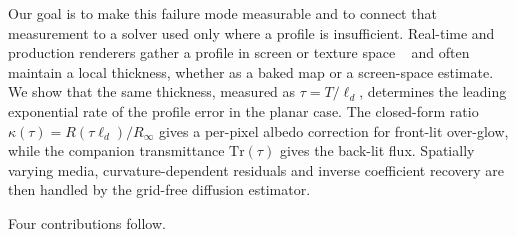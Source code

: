\documentclass[11pt]{article}
\newcommand{\ld}{\ell_d}
\newcommand{\Tr}{\mathrm{Tr}}
\begin{document}
Our goal is to make this failure mode measurable and to connect that measurement
to a solver used only where a profile is insufficient. Real-time and production
renderers gather a profile in screen or texture space
~\cite{jimenez2015separable,burley2015} and often maintain a local thickness,
whether as a baked map or a screen-space estimate. We show that the same
thickness, measured as $\tau=T/\ld$, determines the leading exponential rate of
the profile error in the planar case. The closed-form ratio
$\kappa(\tau)=R(\tau\ld)/R_\infty$ gives a
per-pixel albedo correction for front-lit over-glow, while the companion
transmittance $\Tr(\tau)$ gives the back-lit flux. Spatially varying media,
curvature-dependent residuals and inverse coefficient recovery are then handled
by the grid-free diffusion estimator.

Four contributions follow.
\end{document}
